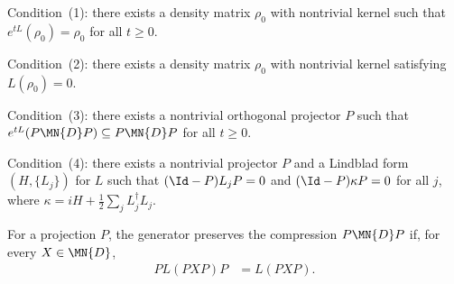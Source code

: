 \begin{definition}\label{def:has_rank_deficient_fixed_density}
    \leanok
    Condition~(1): there exists a density matrix $\rho_0$ with nontrivial
    kernel such that $e^{tL}(\rho_0)=\rho_0$ for all $t\ge0$.
\end{definition}

\begin{definition}\label{def:has_rank_deficient_kernel_element}
    \leanok
    Condition~(2): there exists a density matrix $\rho_0$ with nontrivial
    kernel satisfying $L(\rho_0)=0$.
\end{definition}

\begin{definition}\label{def:has_invariant_compression}
    \leanok
    Condition~(3): there exists a nontrivial orthogonal projector $P$ such
    that $e^{tL}(P\MN{D}P)\subseteq P\MN{D}P$ for all $t\ge0$.
\end{definition}

\begin{definition}
    \label{def:has_block_upper_triangular_lindblad}
    \leanok
    Condition~(4): there exists a nontrivial projector $P$ and a Lindblad form
    $(H,\{L_j\})$ for $L$ such that $(\Id-P)L_jP=0$ and
    $(\Id-P)\kappa P=0$ for all $j$, where
    $\kappa=iH+\frac{1}{2}\sum_jL_j^\dagger L_j$.
\end{definition}

\begin{definition}
    \label{def:generator_preserves_compression_ch12}
    \leanok
    For a projection $P$, the generator preserves the compression
    $P\MN{D}P$ if, for every $X\in\MN{D}$,
    \begin{align}
        P L(PXP)P
        &=L(PXP).
        \label{eq:semigroup_generator_compression}
    \end{align}
\end{definition}

